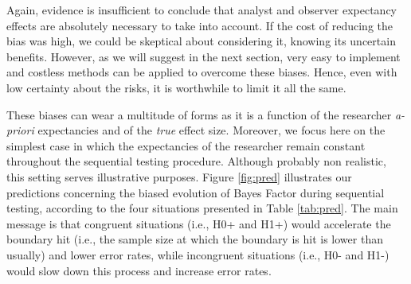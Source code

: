 \documentclass[a4paper,man,natbib,floatsintext,donotrepeattitle]{apa6}
\begin{document}
\vspace{5mm}

\begin{table}[H]
\centering
\caption{Possible interactions between true effect size and a priori beliefs during a sequential testing procedure. Congruent observations are expected to increase the speed of threshold reaching (H0+ and H1+), while incongruent observations are expected to slow down the process (H0- and H1-), and to increase the number of false alarms.}
\label{tab:pred}
\end{table}

Again, evidence is insufficient to conclude that analyst and observer expectancy effects are absolutely necessary to take into account. If the cost of reducing the bias was high, we could be skeptical about considering it, knowing its uncertain benefits. However, as we will suggest in the next section, very easy to implement and costless methods can be applied to overcome these biases. Hence, even with low certainty about the risks, it is worthwhile to limit it all the same. \par


These biases can wear a multitude of forms as it is a function of the researcher \textit{a-priori} expectancies and of the \textit{true} effect size. Moreover, we focus here on the simplest case in which the expectancies of the researcher remain constant throughout the sequential testing procedure. Although probably non realistic, this setting serves illustrative purposes. Figure \ref{fig:pred} illustrates our predictions concerning the biased evolution of Bayes Factor during sequential testing, according to the four situations presented in Table \ref{tab:pred}. The main message is that congruent situations (i.e., H0+ and H1+) would accelerate the boundary hit (i.e., the sample size at which the boundary is hit is lower than usually) and lower error rates, while incongruent situations (i.e., H0- and H1-) would slow down this process and increase error rates.
\end{document}
